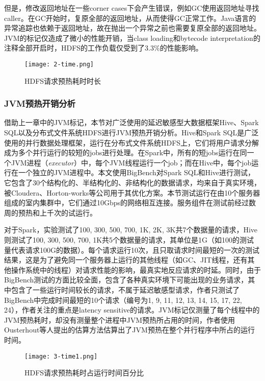 \documentclass[lang=cn,12pt,a4paper,cite=authoryear]{elegantpaper}
\begin{document}
但是，修改返回地址在一些corner cases下会产生错误，例如GC使用返回地址寻找caller。在GC开始时，复原全部的返回地址，从而使得GC正常工作。Java语言的异常追踪也依赖于返回地址，故在抛出一个异常之前也需要复原全部的返回地址。JVM的标记仅造成了微小的性能开销，当class loading和bytecode interpretation的注释全部开启时，HDFS的工作负载仅受到了3.3\%的性能影响。

\begin{figure}
  \centering
  \texttt{[image: 2-time.png]}
  \caption{HDFS请求预热耗时时长}
  \label{fig:time}
\end{figure}

\subsubsection{JVM预热开销分析}
\label{sec:exe}
借助上一章中的JVM标记，本节对广泛使用的延迟敏感型大数据框架Hive\cite{hive}、Spark SQL\cite{DBLP:conf/sigmod/ArmbrustXLHLBMK15}以及分布式文件系统HDFS\cite{hdfs}进行JVM预热开销分析。Hive和Spark SQL是广泛使用的并行数据处理框架，运行在分布式文件系统HDFS上，它们将用户请求分解成为多个并行运行的较短的jobs进行处理。在Spark中，所有的短jobs运行在同一个JVM进程（\textit{executor}）中，每个JVM线程运行一个job；而在Hive中，每个job运行在一个独立的JVM进程中。本文使用BigBench\cite{DBLP:conf/sigmod/GhazalRHRPCJ13}对Spark SQL和Hive进行测试，它包含了30个结构化的、半结构化的、非结构化的数据请求，均来自于真实环境，被Cloudera、Horton-works等公司用于其优化方案。本节测试运行在由10个服务器组成的室内集群中，它们通过10Gbps的网络相互连接。服务组件在测试前经过数周的预热和上千次的试运行。

对于Spark，实验测试了100, 300, 500, 700, 1K, 2K, 3K共7个数据量的请求，Hive则测试了100, 300, 500, 700, 1K共5个数据量的请求，其单位是1G（如100的测试量代表请求100G的数据）。每个请求运行10次，且只取请求时间最短的一次的测试结果，这是为了避免同一个服务器上运行的其他线程（如GC、JIT线程，还有其他操作系统中的线程）对请求性能的影响，最真实地反应请求的时延。同时，由于BigBench测试的方面比较全面，包含了各种真实环境下可能出现的业务请求，其中包含了一些运行时间较长的请求，不属于延迟敏感型请求，作者只测试了BigBench中完成时间最短的10个请求（编号为1, 9, 11, 12, 13, 14, 15, 17, 22, 24），作者关注的重点是latency sensitive的请求。JVM标记仅测量了每个线程中的JVM预热耗时，却没有测量整个进程中JVM预热所占用的时间，作者使用Ousterhout等人提出的估算方法估算出了JVM预热在整个并行程序中所占的运行时间。

\begin{figure}
  \centering
  \texttt{[image: 3-time1.png]}
  \caption{HDFS请求预热耗时占运行时间百分比}
  \label{fig:time2}
\end{figure}
\end{document}
